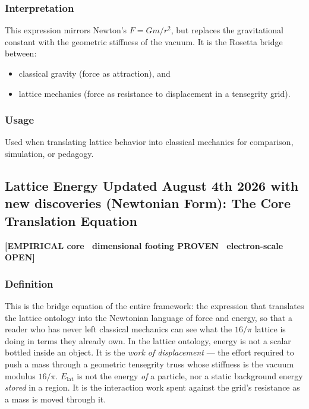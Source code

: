 \documentclass[12pt,oneside]{book}
\begin{document}
\subsubsection{Interpretation}
This expression mirrors Newton’s $F = G m / r^2$, but replaces the gravitational constant with
the geometric stiffness of the vacuum. It is the Rosetta bridge between:

\begin{itemize}
    \item classical gravity (force as attraction), and
    \item lattice mechanics (force as resistance to displacement in a tensegrity grid).
\end{itemize}

\subsubsection{Usage}
Used when translating lattice behavior into classical mechanics for comparison, simulation,
or pedagogy.

\subsection{Lattice Energy Updated August 4th 2026 with new discoveries (Newtonian Form): The Core Translation Equation}
 
\begin{center}
{\color{proventag}\textbf{[EMPIRICAL core \textbullet\ dimensional footing PROVEN \textbullet\ electron-scale OPEN]}}
\end{center}
 
\subsubsection{Definition}
This is the bridge equation of the entire framework: the expression that translates
the lattice ontology into the Newtonian language of force and energy, so that a reader
who has never left classical mechanics can see what the $16/\pi$ lattice is doing in
terms they already own. In the lattice ontology, energy is not a scalar bottled inside
an object. It is the \emph{work of displacement} --- the effort required to push a mass
through a geometric tensegrity truss whose stiffness is the vacuum modulus $16/\pi$.
$E_{\mathrm{lat}}$ is not the energy \emph{of} a particle, nor a static background energy
\emph{stored} in a region. It is the interaction work spent against the grid's resistance
as a mass is moved through it.
 
\end{document}
